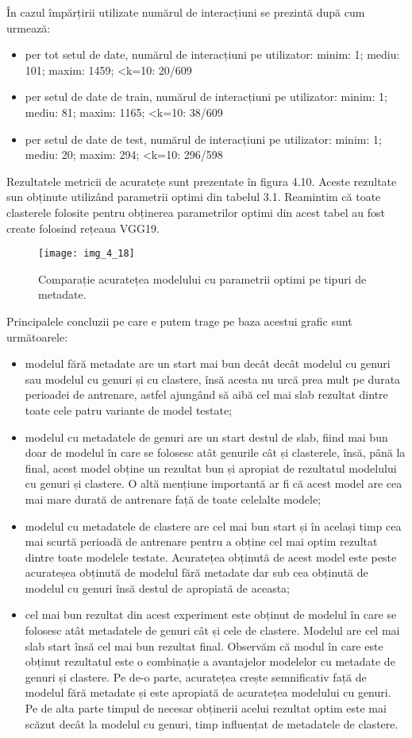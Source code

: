 În cazul împărțirii utilizate numărul de interacțiuni se prezintă după cum urmează:
\begin{itemize}
	\item per tot setul de date, numărul de interacțiuni pe utilizator: minim: 1; mediu: 101; maxim: 1459; <k=10: 20/609 
	\item per setul de date de train, numărul de interacțiuni pe utilizator: minim: 1; mediu: 81; maxim: 1165; <k=10: 38/609
	\item per setul de date de test, numărul de interacțiuni pe utilizator: minim: 1; mediu: 20; maxim: 294; <k=10: 296/598
\end{itemize}

Rezultatele metricii de acuratețe sunt prezentate în figura 4.10. Aceste rezultate sun obținute utilizând parametrii optimi din tabelul 3.1. Reamintim că toate clasterele folosite pentru obținerea parametrilor optimi din acest tabel au fost create folosind rețeaua VGG19.
\begin{figure}[!h]
	\centering
	\texttt{[image: img\_4\_18]}
	\caption[Comparație acuratețea modelului cu parametrii optimi pe tipuri de metadate]{Comparație acuratețea modelului cu parametrii optimi pe tipuri de metadate.}
\end{figure}
Principalele concluzii pe care e putem trage pe baza acestui grafic sunt următoarele:
\begin{itemize}
	\item modelul fără metadate are un start mai bun decât decât modelul cu genuri sau modelul cu genuri și cu clastere, însă acesta nu urcă prea mult pe durata perioadei de antrenare, astfel ajungând să aibă cel mai slab rezultat dintre toate cele patru variante de model testate;
	\item modelul cu metadatele de genuri are un start destul de slab, fiind mai bun doar de modelul în care se folosesc atât genurile cât și clasterele, însă, până la final, acest model obține un rezultat bun și apropiat de rezultatul modelului cu genuri și clastere. O altă mențiune importantă ar fi că acest model are cea mai mare durată de antrenare față de toate celelalte modele;
	\item modelul cu metadatele de clastere are cel mai bun start și în același timp cea mai scurtă perioadă de antrenare pentru a obține cel mai optim rezultat dintre toate modelele testate. Acuratețea obținută de acest model este peste acurateșea obținută de modelul fără metadate dar sub cea obținută de modelul cu genuri însă destul de apropiată de aceasta;
	\item cel mai bun rezultat din acest experiment este obținut de modelul în care se folosesc atât metadatele de genuri cât și cele de clastere. Modelul are cel mai slab start însă cel mai bun rezultat final. Observăm că modul în care este obținut rezultatul este o combinație a avantajelor modelelor cu metadate de genuri și clastere. Pe de-o parte, acuratețea crește semnificativ față de modelul fără metadate și este apropiată de acuratețea modelului cu genuri. Pe de alta parte timpul de necesar obținerii acelui rezultat optim este mai scăzut decât la modelul cu genuri, timp influențat de metadatele de clastere.
\end{itemize}

